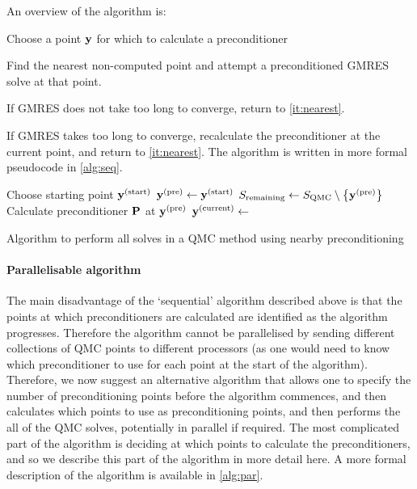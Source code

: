 An overview of the algorithm is:
\ben
\item Choose a point $\mathbf{y}$ for which to calculate a preconditioner
\item\label{it:nearest} Find the nearest non-computed point and attempt a preconditioned GMRES solve at that point.
    \item If GMRES does not take too long to converge, return to \cref{it:nearest}.
\item If GMRES takes too long to converge, recalculate the preconditioner at the current point, and return to \cref{it:nearest}.
  \een
  The algorithm is written in more formal pseudocode in \cref{alg:seq}.
\begin{algorithm}[h]
\DontPrintSemicolon
{}

\Input{$\maxGMRES$,$\SQMC$}
\BlankLine
Choose starting point $\mathbf{y}^{(\mathrm{start})}$\;
$\mathbf{y}^{(\mathrm{pre})} \leftarrow \mathbf{y}^{(\mathrm{start})}$\;
$\Sremaining \defined \SQMC\setminus\set{\bypre}$\;
Calculate preconditioner $\mathbf{P}$ at $\mathbf{y}^{(\mathrm{pre})}$\;
$\mathbf{y}^{(\mathrm{current})} \leftarrow$ \Nearest{$\bypre,\Sremaining$}\;
\caption{Algorithm to perform all solves in a QMC method using nearby preconditioning\label{alg:seq}}
\end{algorithm}
\paragraph{Parallelisable algorithm} The main disadvantage of the `sequential' algorithm described above is that the points at which preconditioners are calculated are identified as the algorithm progresses. Therefore the algorithm cannot be parallelised by sending different collections of QMC points to different processors (as one would need to know which preconditioner to use for each point at the start of the algorithm). Therefore, we now suggest an alternative algorithm that allows one to specify the number of preconditioning points before the algorithm commences, and then calculates which points to use as preconditioning points, and then performs the all of the QMC solves, potentially in parallel if required. The most complicated part of the algorithm is deciding at which points to calculate the preconditioners, and so we describe this part of the algorithm in more detail here. A more formal description of the algorithm is available in \cref{alg:par}.

